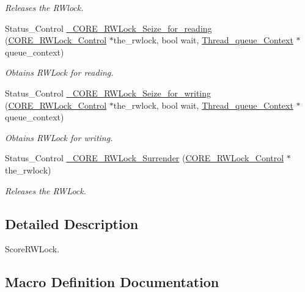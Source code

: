\begin{DoxyCompactItemize}
\begin{DoxyCompactList}\small\item\em Releases the R\+Wlock. \end{DoxyCompactList}\item 
Status\+\_\+\+Control \mbox{\hyperlink{group__RTEMSScoreRWLock_ga44d546f0608f0a64a0473cf70bcd251c}{\+\_\+\+C\+O\+R\+E\+\_\+\+R\+W\+Lock\+\_\+\+Seize\+\_\+for\+\_\+reading}} (\mbox{\hyperlink{structCORE__RWLock__Control}{C\+O\+R\+E\+\_\+\+R\+W\+Lock\+\_\+\+Control}} $\ast$the\+\_\+rwlock, bool wait, \mbox{\hyperlink{structThread__queue__Context}{Thread\+\_\+queue\+\_\+\+Context}} $\ast$queue\+\_\+context)
\begin{DoxyCompactList}\small\item\em Obtains R\+W\+Lock for reading. \end{DoxyCompactList}\item 
Status\+\_\+\+Control \mbox{\hyperlink{group__RTEMSScoreRWLock_ga83de98cd4ad1f99dc3f89b6b31d3d9e8}{\+\_\+\+C\+O\+R\+E\+\_\+\+R\+W\+Lock\+\_\+\+Seize\+\_\+for\+\_\+writing}} (\mbox{\hyperlink{structCORE__RWLock__Control}{C\+O\+R\+E\+\_\+\+R\+W\+Lock\+\_\+\+Control}} $\ast$the\+\_\+rwlock, bool wait, \mbox{\hyperlink{structThread__queue__Context}{Thread\+\_\+queue\+\_\+\+Context}} $\ast$queue\+\_\+context)
\begin{DoxyCompactList}\small\item\em Obtains R\+W\+Lock for writing. \end{DoxyCompactList}\item 
Status\+\_\+\+Control \mbox{\hyperlink{group__RTEMSScoreRWLock_ga52aa185dba7e461fae75d0cb7a183279}{\+\_\+\+C\+O\+R\+E\+\_\+\+R\+W\+Lock\+\_\+\+Surrender}} (\mbox{\hyperlink{structCORE__RWLock__Control}{C\+O\+R\+E\+\_\+\+R\+W\+Lock\+\_\+\+Control}} $\ast$the\+\_\+rwlock)
\begin{DoxyCompactList}\small\item\em Releases the R\+W\+Lock. \end{DoxyCompactList}\end{DoxyCompactItemize}


\subsection{Detailed Description}
Score\+R\+W\+Lock. 



\subsection{Macro Definition Documentation}
\mbox{\label{group__RTEMSScoreRWLock_gac88a0cdbbcd081c7287cc519159b1727}} 
